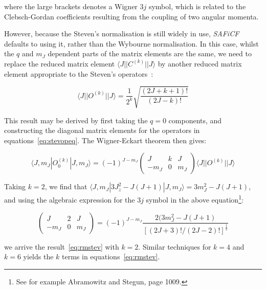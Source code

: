 \documentclass[12pt,onecolumn,tightenlines,aps,amsmath,floatfix,notitlepage,nofootinbib]{revtex4}
\newcommand{\bra}[1]{\langle #1|}
\newcommand{\ket}[1]{|#1\rangle}
\begin{document}
\noindent where the large brackets denotes a Wigner $3j$ symbol, which is related to the Clebsch-Gordan coefficients resulting from the coupling of two angular momenta.

However, because the Steven's normalisation is still widely in use, \emph{SAFiCF} defaults to using it, rather than the Wybourne normalisation. In this case, whilst the $q$ and $m_J$ dependent parts of the matrix elements are the same, we need to replace the reduced matrix element $\bra{J}|C^{(k)}|\ket{J}$ by another reduced matrix element appropriate to the Steven's operators~\cite{ST66}:

\begin{equation} \label{eq:rmstev}
\bra{J}|O^{(k)}|\ket{J} = \frac{1}{2^k} \sqrt{\frac{(2J+k+1)!}{(2J-k)!}}
\end{equation}

\noindent This result may be derived by first taking the $q=0$ components, and constructing the diagonal matrix elements for the operators in equations~\ref{eq:stevopeq}. The Wigner-Eckart theorem then gives:

\[ \bra{J,m_J}O_0^{(k)}\ket{J,m_J} = (-1)^{J-m_J} \left( \begin{array}{ccc} J & k & J \\ -m_J & 0 & m_J \end{array} \right) \bra{J}|O^{(k)}|\ket{J} \]

\noindent Taking $k=2$, we find that $\bra{J,m_J}3J_z^2-J(J+1)\ket{J,m_J} = 3m_J^2-J(J+1)$, and using the algebraic expression for the 3$j$ symbol in the above equation\footnote{See for example Abramowitz and Stegun, page 1009.}:

\[ \left( \begin{array}{ccc} J & 2 & J \\ -m_J & 0 & m_J \end{array} \right) = (-1)^{J-m_J} \frac{2(3m_J^2 - J(J+1)}{[(2J+3)!/(2J-2)!]^\frac{1}{2}} \]

\noindent we arrive the result~\ref{eq:rmstev} with $k=2$. Similar techniques for $k=4$ and $k=6$ yields the $k$ terms in equations~\ref{eq:rmstev}.


\end{document}
